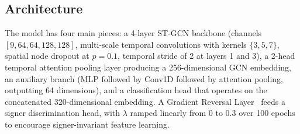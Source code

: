 \documentclass[conference]{IEEEtran}
\begin{document}
\subsection{Architecture}

The model has four main pieces: a 4-layer ST-GCN backbone (channels $[9, 64, 64, 128, 128]$, multi-scale temporal convolutions with kernels $\{3, 5, 7\}$, spatial node dropout at $p=0.1$, temporal stride of 2 at layers 1 and 3), a 2-head temporal attention pooling layer producing a 256-dimensional GCN embedding, an auxiliary branch (MLP followed by Conv1D followed by attention pooling, outputting 64 dimensions), and a classification head that operates on the concatenated 320-dimensional embedding. A Gradient Reversal Layer~\cite{ganin2016domain} feeds a signer discrimination head, with $\lambda$ ramped linearly from 0 to 0.3 over 100 epochs to encourage signer-invariant feature learning.
\end{document}

